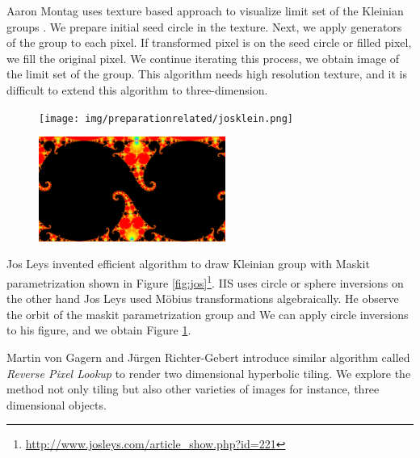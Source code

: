 Aaron Montag uses texture based approach to visualize limit set of the
Kleinian groups \cite{Montag2014hyperbolicIFS}.
We prepare initial seed circle in the texture.
Next, we apply generators of the group to each pixel.
If transformed pixel is on the seed circle or filled pixel, we fill the original pixel.
We continue iterating this process, we obtain image of the limit set of
the group.
This algorithm needs high resolution texture, and it is difficult to
extend this algorithm to three-dimension.

\begin{figure}[htbp]
 \begin{minipage}[t]{0.5\hsize}
  \center
  \texttt{[image: img/preparationrelated/josklein.png]}
  \caption{\textit{}}
  \label{fig:jos}
  \hspace*{\fill}
 \end{minipage}
 \begin{minipage}[t]{0.5\hsize}
  \center
  \includegraphics[height=1.35in, keepaspectratio]{img/preparation/related/joskleinInv.png}
  \caption{\textit{}}
  \label{fig:josInv}
  \hspace*{\fill}
 \end{minipage}
\end{figure}

Jos Leys invented efficient algorithm to draw Kleinian group with Maskit
parametrization shown in Figure \ref{fig:jos}\footnote{\url{http://www.josleys.com/article_show.php?id=221}}.
IIS uses circle or sphere inversions on the other hand Jos Leys used
M\"obius transformations algebraically.
He observe the orbit of the maskit parametrization group and 
We can apply circle inversions to his figure, and we obtain Figure \ref{fig:josInv}.

Martin von Gagern and Jürgen Richter-Gebert introduce similar algorithm
called \textit{Reverse Pixel Lookup}
\cite{journals/combinatorics/GagernR09} to render two dimensional hyperbolic tiling.
We explore the method not only tiling but also other varieties of
images for instance, three dimensional objects.
